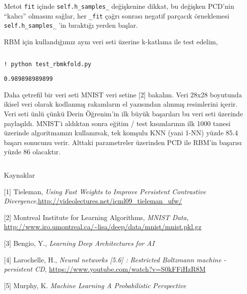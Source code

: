 \documentclass[12pt,fleqn]{article}\usepackage{../../common}
\begin{document}
Metot \verb!fit! içinde \verb!self.h_samples_! değişkenine dikkat, bu
değişken PCD'nin ``kalıcı'' olmasını sağlar, her \verb!_fit! çağrı sonrası
negatif parçacık örneklemesi \verb!self.h_samples_! 'in bıraktığı yerden
başlar.

RBM için kullandığımız aynı veri seti üzerine k-katlama ile test edelim,

\inputminted[fontsize=\footnotesize]{python}{test_rbmkfold.py}

\begin{verbatim}
! python test_rbmkfold.py
\end{verbatim}

\begin{verbatim}
0.989898989899
\end{verbatim}

Daha çetrefil bir veri seti MNIST veri setine [2] bakalım. Veri 28x28
boyutunda ikisel veri olarak kodlanmış rakamların el yazısından alınmış
resimlerini içerir. Veri seti ünlü çünkü Derin Öğrenim'in ilk büyük
başarıları bu veri seti üzerinde paylaşıldı. MNIST'i aldıktan sonra eğitim
/ test kısımlarının ilk 1000 tanesi üzerinde algoritmamızı kullanırsak, tek
komşulu KNN (yani 1-NN) yüzde 85.4 başarı sonucunu verir. Alttaki
parametreler üzerinden PCD ile RBM'in başarısı yüzde 86 olacaktır.

\inputminted[fontsize=\footnotesize]{python}{test_mnist.py}

Kaynaklar

[1] Tieleman, {\em Using Fast Weights to Improve Persistent Contrastive Divergence},\url{http://videolectures.net/icml09_tieleman_ufw/}

[2] Montreal Institute for Learning Algorithms, {\em MNIST Data}, \url{http://www.iro.umontreal.ca/~lisa/deep/data/mnist/mnist.pkl.gz}

[3] Bengio, Y., {\em Learning Deep Architectures for AI}

[4] Larochelle, H., {\em Neural networks [5.6] : Restricted Boltzmann machine - persistent CD},  \url{https://www.youtube.com/watch?v=S0kFFiHzR8M}

[5] Murphy, K. {\em Machine Learning A Probabilistic Perspective}
\end{document}
